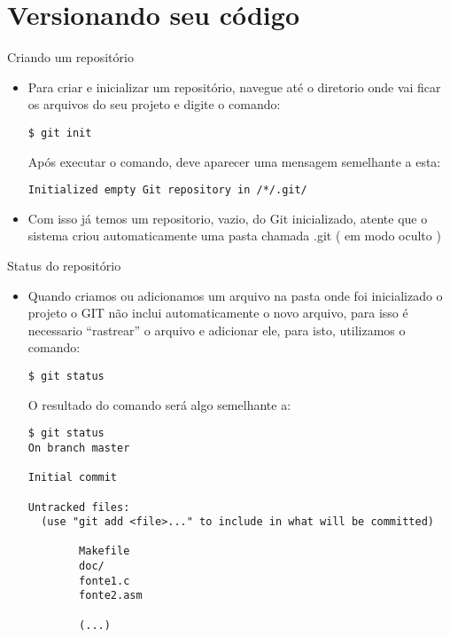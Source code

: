 \section{Versionando seu código}

\begin{slide}[method=direct]{Criando um repositório}
	\begin{itemize}
		\item{Para criar e inicializar um repositório, navegue até o diretorio onde vai ficar os arquivos do seu projeto e digite o comando:
			\begin{lstlisting}[style=Bash]
$ git init
			\end{lstlisting}
		Após executar o comando, deve aparecer uma mensagem semelhante a esta:
		\begin{lstlisting}
Initialized empty Git repository in /*/.git/
		\end{lstlisting}
		}
		
		\item{Com isso já temos um repositorio, vazio, do Git inicializado, atente que o sistema criou automaticamente uma pasta chamada .git ( em modo oculto )}
	\end{itemize}
\end{slide}

\begin{slide}[method=direct]{Status do repositório}
	\begin{itemize}
		\item{Quando criamos ou adicionamos um arquivo na pasta onde foi inicializado o projeto o GIT não inclui automaticamente o novo arquivo, para isso é necessario ``rastrear'' o arquivo e adicionar ele, para isto, utilizamos o comando:
			\begin{lstlisting}[style=Bash]
$ git status
			\end{lstlisting}
			
			O resultado do comando será algo semelhante a:
			\begin{lstlisting}[basicstyle=\tiny]
$ git status
On branch master

Initial commit

Untracked files:
  (use "git add <file>..." to include in what will be committed)

        Makefile
        doc/
        fonte1.c
        fonte2.asm
        
        (...)
\end{lstlisting}
			}
	\end{itemize}
\end{slide}

